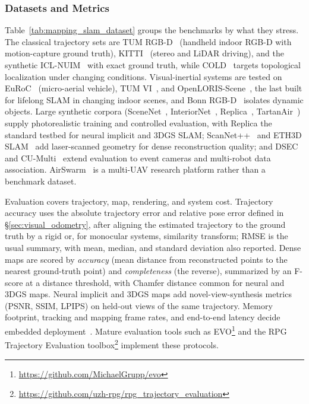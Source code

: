 \subsubsection{Datasets and Metrics}
Table~\ref{tab:mapping_slam_dataset} groups the benchmarks by what they stress. The classical trajectory sets are TUM RGB-D~\cite{Sturm2012TUMRGBD} (handheld indoor RGB-D with motion-capture ground truth), KITTI~\cite{KITTI-GeigerLU12} (stereo and LiDAR driving), and the synthetic ICL-NUIM~\cite{HandaWMD14} with exact ground truth, while COLD~\cite{PronobisC09} targets topological localization under changing conditions. Visual-inertial systems are tested on EuRoC~\cite{Burri2016EuRoC} (micro-aerial vehicle), TUM VI~\cite{Schubert2018TUMVI}, and OpenLORIS-Scene~\cite{ShiLZTTLZSQSGW020}, the last built for lifelong SLAM in changing indoor scenes, and Bonn RGB-D~\cite{PalazzoloBLGS19} isolates dynamic objects. Large synthetic corpora (SceneNet~\cite{McCormacHLD17}, InteriorNet~\cite{LiSMCTYHTL18}, Replica~\cite{straub2019replica}, TartanAir~\cite{TartanAir}) supply photorealistic training and controlled evaluation, with Replica the standard testbed for neural implicit and 3DGS SLAM; ScanNet++~\cite{yeshwanth2023scannet++} and ETH3D SLAM~\cite{ETH3DSLAM} add laser-scanned geometry for dense reconstruction quality; and DSEC~\cite{gehrig2021dsec} and CU-Multi~\cite{albin2025cu} extend evaluation to event cameras and multi-robot data association. AirSwarm~\cite{li2025airswarm} is a multi-UAV research platform rather than a benchmark dataset.

Evaluation covers trajectory, map, rendering, and system cost. Trajectory accuracy uses the absolute trajectory error and relative pose error defined in \S\ref{sec:visual_odometry}, after aligning the estimated trajectory to the ground truth by a rigid or, for monocular systems, similarity transform; RMSE is the usual summary, with mean, median, and standard deviation also reported.
Dense maps are scored by \emph{accuracy} (mean distance from reconstructed points to the nearest ground-truth point) and \emph{completeness} (the reverse), summarized by an F-score at a distance threshold, with Chamfer distance common for neural and 3DGS maps. Neural implicit and 3DGS maps add novel-view-synthesis metrics (PSNR, SSIM, LPIPS) on held-out views of the same trajectory. Memory footprint, tracking and mapping frame rates, and end-to-end latency decide embedded deployment~\cite{Guadagnino2025KISSSLAM}.
Mature evaluation tools such as EVO\footnote{\url{https://github.com/MichaelGrupp/evo}} and the RPG Trajectory Evaluation toolbox\footnote{\url{https://github.com/uzh-rpg/rpg_trajectory_evaluation}} implement these protocols.








